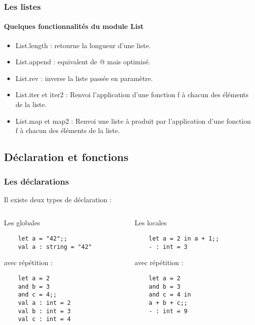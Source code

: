 \begin{frame}[fragile]
	\frametitle{Les listes}
	\framesubtitle{Quelques fonctionnalités du module List}
	\begin{itemize}
	
	\item List.length : retourne la longueur d'une liste.	
	
	\item List.append : equivalent de @ mais optimisé.
	
	\item List.rev : inverse la liste passée en paramètre.
	
	\item List.iter et iter2 : Renvoi l'application d'une fonction f à chacun des éléments de la liste.

	\item List.map et map2 : Renvoi une liste à produit par l'application d'une fonction f à chacun des éléments de la liste.

	\end{itemize}
\end{frame}


\subsection{Déclaration et fonctions} %
\begin{frame}[fragile]
      \frametitle{Les déclarations}
      Il existe deux types de déclaration :
	\begin{columns}[t]
		\begin{column}{5cm}
		\begin{block}{Les globales}
		\begin{lstlisting}
	let a = "42";;
	val a : string = "42"
	\end{lstlisting}
	avec répétition :
	\begin{lstlisting}
	let a = 2
	and b = 3
	and c = 4;;
	val a : int = 2
	val b : int = 3
	val c : int = 4
		\end{lstlisting}
		\end{block}
		\end{column}
      		\begin{column}{5cm}
		\begin{block}{Les locales}
		\begin{lstlisting}
	let a = 2 in a + 1;;
	- : int = 3
	\end{lstlisting}
	avec répétition :
	\begin{lstlisting}
	let a = 2
	and b = 3
	and c = 4 in
	a + b + c;;
	- : int = 9
		\end{lstlisting}
		\end{block}
      		\end{column}
	\end{columns}
\end{frame}

